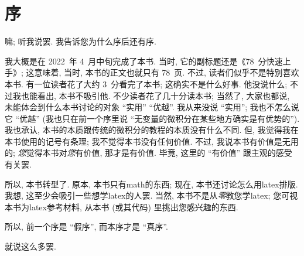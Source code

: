 \chapter{序}

嘛; 听我说罢.
我告诉您为什么序后还有序.

我大概是在 2022~年 4~月中旬完成了本书.
当时, 它的副标题还是《78~分快速上手》;
这意味着, 当时, 本书的正文也就只有 78~页.
不过, 读者们似乎不是特别喜欢本书.
有一位读者花了大约 3~分看完了本书;
这确实不是什么好事.
他没说什么; 不过我也能看出, 本书不吸引他.
不少读者花了几十分读本书;
当然了, 大家也都说,
未能体会到什么本书讨论的对象 ``实用'' ``优越''.
我从来没说 ``实用'';
我也不怎么说它 ``优越''
(我也只在前一个序里说 ``无变量的微积分在某些地方确实是有优势的'').
我也承认, 本书的本质跟传统的微积分的教程的本质没有什么不同.
但, 我觉得我在本书使用的记号有条理;
我不觉得本书没有任何价值.
不过, 我说本书有价值是无用的;
\emph{您}觉得本书对\emph{您}有价值, 那才是有价值.
毕竟, 这里的 ``有价值'' 跟主观的感受有关罢.

所以, 本书转型了.
原本, 本书只有\gls{math}的东西;
现在, 本书还讨论怎么用\gls{latex}排版.
我想, 这至少会吸引一些想学\gls{latex}的人罢.
当然, 本书不是从\emph{零}教您学\gls{latex};
您可视本书为\gls{latex}参考材料,
从本书 (或其代码) 里挑出您感兴趣的东西.

所以, 前一个序是 ``假序'', 而本序才是 ``真序''.

就说这么多罢.

\begin{flushright}
    \theauthor\\
    \thedate
\end{flushright}
